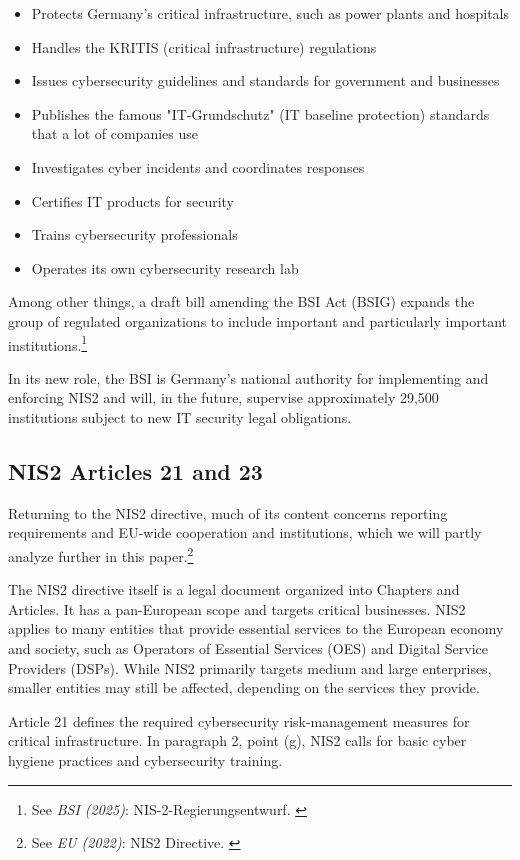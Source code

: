 \begin{itemize}
    \item Protects Germany's critical infrastructure, such as power plants and hospitals
    \item Handles the KRITIS (critical infrastructure) regulations
    \item Issues cybersecurity guidelines and standards for government and businesses
    \item Publishes the famous "IT-Grundschutz" (IT baseline protection) standards that a lot of companies use
    \item Investigates cyber incidents and coordinates responses
    \item Certifies IT products for security
    \item Trains cybersecurity professionals
    \item Operates its own cybersecurity research lab
\end{itemize}

Among other things, a draft bill amending the BSI Act (BSIG) expands the group of regulated organizations to include important and particularly important institutions.\footnote{See \textit{BSI (2025)}: NIS-2-Regierungsentwurf. \cite{presseNis2}}

In its new role, the BSI is Germany's national authority for implementing and enforcing NIS2 and will, in the future, supervise approximately 29,500 institutions subject to new IT security legal obligations.

\subsection{NIS2 Articles 21 and 23}

Returning to the NIS2 directive, much of its content concerns reporting requirements and EU-wide cooperation and institutions, which we will partly analyze further in this paper.\footnote{See \textit{EU (2022)}: NIS2 Directive. \cite{nis2}}

The NIS2 directive itself is a legal document organized into Chapters and Articles. It has a pan-European scope and targets critical businesses. NIS2 applies to many entities that provide essential services to the European economy and society, such as Operators of Essential Services (OES) and Digital Service Providers (DSPs). While NIS2 primarily targets medium and large enterprises, smaller entities may still be affected, depending on the services they provide.

Article 21 defines the required cybersecurity risk-management measures for critical infrastructure. In paragraph 2, point (g), NIS2 calls for basic cyber hygiene practices and cybersecurity training.

